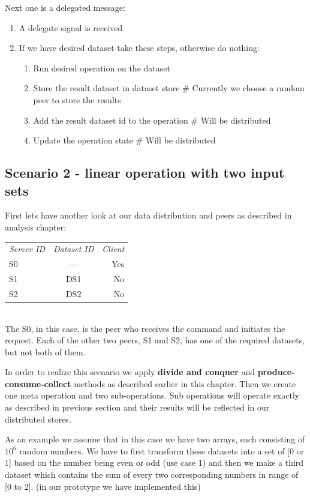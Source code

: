 Next one is a delegated message:
\begin{enumerate}
\item A delegate signal is received.
\item If we have desired dataset take these steps, otherwise do nothing:
  \begin{enumerate}
  \item Run desired operation on the dataset
  \item Store the result dataset in dataset store \# Currently we choose a random peer to store the results
  \item Add the result dataset id to the operation \# Will be distributed
  \item Update the operation state \# Will be distributed
  \end{enumerate}
\end{enumerate}

\subsection{Scenario 2 - linear operation with two input sets}
First lets have another look at our data distribution and peers as described in analysis chapter:

\begin{tabular}{ l c r }
\em{Server ID} & \em{ Dataset ID} & \em{ Client} \\
S0 & --- & Yes \\
S1 & DS1 & No \\
S2 & DS2 & No \\
\end{tabular}\\

The S0, in this case, is the peer who receives the command and initiates the request. 
Each of the other two peers, S1 and S2, has one of the required datasets, but not both of them. 

In order to realize this scenario we apply \textbf{divide and conquer} and \textbf{produce-consume-collect} methods
as described earlier in this chapter. Then we create one meta operation and two sub-operations. 
Sub operations will operate exactly as described in previous section
and their results will be reflected in our distributed stores.

As an example we assume that in this case we have two arrays, each consisting of \(10^6\) random numbers. 
We have to first transform these datasets into a set of [0 or 1] based on the number being even or odd (use case 1) 
and then we make a third dataset which contains the sum of every two corresponding numbers in range of [0 to 2].
(in our prototype we have implemented this)

